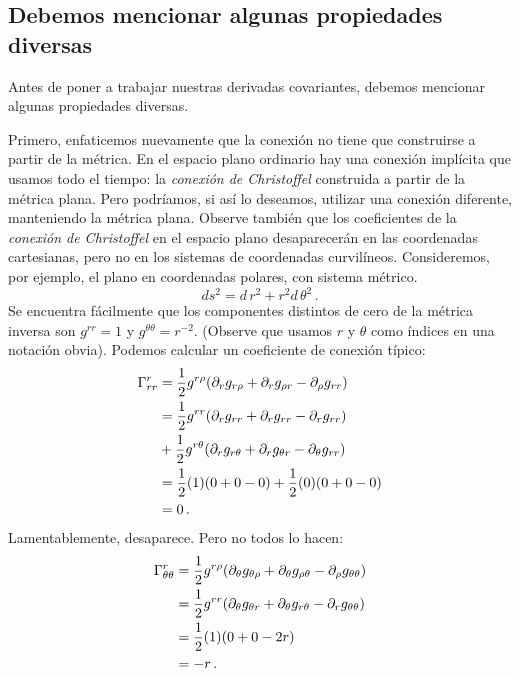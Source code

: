 \documentclass[11pt,b5paper,openany,twoside]{book}
\newcommand{\p}[1]{{\partial_{#1}}}
\begin{document}
\subsection{Debemos mencionar algunas propiedades diversas}

Antes de poner a trabajar nuestras derivadas covariantes, debemos mencionar algunas propiedades diversas.

Primero, enfaticemos nuevamente que la conexión no tiene que construirse a partir de la métrica.
En el espacio plano ordinario hay una conexión implícita que usamos todo el tiempo: la \textit{conexión de Christoffel} construida a partir de la métrica plana.
Pero podríamos, si así lo deseamos, utilizar una conexión diferente, manteniendo la métrica plana.
Observe también que los coeficientes de la \textit{conexión de Christoffel} en el espacio plano desaparecerán en las coordenadas cartesianas, pero no en los sistemas de coordenadas curvilíneos.
Consideremos, por ejemplo, el plano en coordenadas polares, con sistema métrico.
\begin{equation}
ds^2 = d\,r^2 + r^2 d\,\theta^2\,.\label{3.22}
\end{equation}
Se encuentra fácilmente que los componentes distintos de cero de la métrica inversa son $g^{rr}=1$ y $g^{\theta\theta}=r^{-2}$.
(Observe que usamos $r$ y $\theta$ como índices en una notación obvia).
Podemos calcular un coeficiente de conexión típico:
\begin{align}
\Gamma^r_{rr} &=  {1\over 2} g^{r\rho}(\p{r} g_{r\rho} +
\p{r} g_{\rho r} - \p\rho g_{rr}) \notag \\
&=  {1\over 2} g^{rr}(\p{r} g_{rr} +
\p{r} g_{rr} - \p{r} g_{rr}) \notag \\
& + {1\over 2} g^{r\theta}(\p{r} g_{r\theta} +
\p{r} g_{\theta r} - \p\theta g_{rr}) \notag \\
&=  {1\over 2}(1)(0+0-0) + {1\over 2}(0)(0+0-0) \notag \\
&= 0\,. \label{3.23}
\end{align}
Lamentablemente, desaparece.
Pero no todos lo hacen:
\begin{align}
\Gamma^r_{\theta\theta} &=  {1\over 2} g^{r\rho}
(\p{\theta} g_{\theta\rho} + \p{\theta} g_{\rho \theta}
- \p\rho g_{\theta\theta}) \notag \\
&=  {1\over 2}g^{rr}
(\p{\theta} g_{\theta r} + \p{\theta} g_{r \theta}
- \p{r} g_{\theta\theta}) \notag \\
&=  {1\over 2}(1)(0+0-2r) \notag \\
&=  -r\,. \label{3.24}
\end{align}
\end{document}
